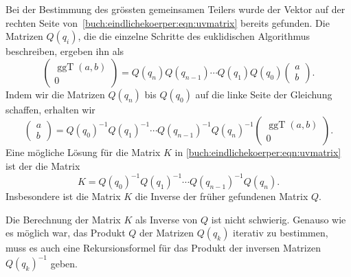 Bei der Bestimmung des grössten gemeinsamen Teilers wurde der Vektor auf
der rechten Seite von~\eqref{buch:eindlichekoerper:eqn:uvmatrix} bereits
gefunden.
Die Matrizen $Q(q_i)$, die die einzelne Schritte des euklidischen
Algorithmus beschreiben, ergeben ihn als
\[
\begin{pmatrix}
\operatorname{ggT}(a,b)\\0
\end{pmatrix}
=
Q(q_n)Q(q_{n-1}) \cdots Q(q_1)Q(q_0)
\begin{pmatrix}a\\b\end{pmatrix}.
\]
Indem wir die Matrizen $Q(q_n)$ bis $Q(q_0)$ auf die linke Seite der
Gleichung schaffen, erhalten wir
\[
\begin{pmatrix}a\\b\end{pmatrix}
=
Q(q_0)^{-1}
Q(q_1)^{-1}
\cdots
Q(q_{n-1})^{-1}
Q(q_n)^{-1}
\begin{pmatrix}\operatorname{ggT}(a,b)\\0\end{pmatrix}.
\]
Eine mögliche Lösung für die Matrix $K$ in
\eqref{buch:eindlichekoerper:eqn:uvmatrix}
ist der die Matrix
\[
K
=
Q(q_0)^{-1}
Q(q_1)^{-1}
\cdots
Q(q_{n-1})^{-1}
Q(q_n).
\]
Insbesondere ist die Matrix $K$ die Inverse der früher gefundenen
Matrix $Q$.

Die Berechnung der Matrix $K$ als Inverse von $Q$ ist nicht schwierig.
Genauso wie es möglich war, das Produkt $Q$ der Matrizen
$Q(q_k)$ iterativ zu bestimmen, muss es auch eine Rekursionsformel
für das Produkt der inversen Matrizen $Q(q_k)^{-1}$ geben.

